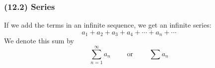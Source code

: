 \begin{frame}
\frametitle{(12.2)  Series}
\begin{definition}[Series]
If we add the terms in an infinite sequence, we get an infinite series:
\[
a_1 + a_2 + a_3 + a_4 + \cdots + a_n + \cdots 
\]
We denote this sum by
\[
\sum_{n = 1}^\infty a_n \qquad \textrm{ or } \qquad \sum a_n
\]
\end{definition}
\end{frame}
